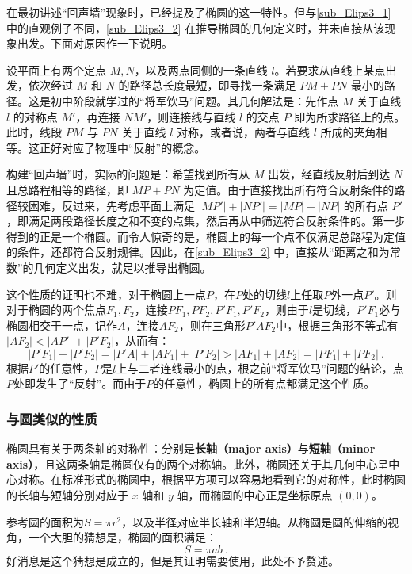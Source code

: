 在最初讲述“回声墙”现象时，已经提及了椭圆的这一特性。但与\autoref{sub_Elips3_1} 中的直观例子不同，\autoref{sub_Elips3_2} 在推导椭圆的几何定义时，并未直接从该现象出发。下面对原因作一下说明。

设平面上有两个定点 $M,N$，以及两点同侧的一条直线 $l$。若要求从直线上某点出发，依次经过 $M$ 和 $N$ 的路径总长度最短，即寻找一条满足 $PM + PN$ 最小的路径。这是初中阶段就学过的“将军饮马”问题。其几何解法是：先作点 $M$ 关于直线 $l$ 的对称点 $M'$，再连接 $NM'$，则连接线与直线 $l$ 的交点 $P$ 即为所求路径上的点。此时，线段 $PM$ 与 $PN$ 关于直线 $l$ 对称，或者说，两者与直线 $l$ 所成的夹角相等。这正好对应了物理中“反射”的概念。

构建“回声墙”时，实际的问题是：希望找到所有从 $M$ 出发，经直线反射后到达 $N$ 且总路程相等的路径，即 $MP + PN$ 为定值。由于直接找出所有符合反射条件的路径较困难，反过来，先考虑平面上满足 $|MP'| + |NP'| = |MP| + |NP|$ 的所有点 $P'$，即满足两段路径长度之和不变的点集，然后再从中筛选符合反射条件的。第一步得到的正是一个椭圆。而令人惊奇的是，椭圆上的每一个点不仅满足总路程为定值的条件，还都符合反射规律。因此，在\autoref{sub_Elips3_2} 中，直接从“距离之和为常数”的几何定义出发，就足以推导出椭圆。


这个性质的证明也不难，对于椭圆上一点$P$，在$P$处的切线$l$上任取$P$外一点$P'$。则对于椭圆的两个焦点$F_1,F_2$，连接$PF_1,PF_2,P'F_1,P'F_2$，则由于$l$是切线，$P'F_1$必与椭圆相交于一点，记作$A$，连接$AF_2$，则在三角形$P'AF_2$中，根据三角形不等式有$|AF_2|<|AP'|+|P'F_2|$，从而有：
\begin{equation}
|P'F_1|+|P'F_2|=|P'A|+|AF_1|+|P'F_2|>|AF_1|+|AF_2|=|PF_1|+|PF_2|~.
\end{equation}
根据$P'$的任意性，$P$是$l$上与二者连线最小的点，根之前“将军饮马”问题的结论，点$P$处即发生了“反射”。而由于$P$的任意性，椭圆上的所有点都满足这个性质。

\subsubsection{与圆类似的性质}

椭圆具有关于两条轴的对称性：分别是\textbf{长轴（major axis）}与\textbf{短轴（minor axis）}，且这两条轴是椭圆仅有的两个对称轴。此外，椭圆还关于其几何中心呈中心对称。在标准形式的椭圆中，根据平方项可以容易地看到它的对称性，此时椭圆的长轴与短轴分别对应于 $x$ 轴和 $y$ 轴，而椭圆的中心正是坐标原点 $(0,0)$。

参考圆的面积为$S = \pi r^2$，以及半径对应半长轴和半短轴。从椭圆是圆的伸缩的视角，一个大胆的猜想是，椭圆的面积满足：
\begin{equation}
S = \pi a b~.
\end{equation}
好消息是这个猜想是成立的，但是其证明需要使用，此处不予赘述。

